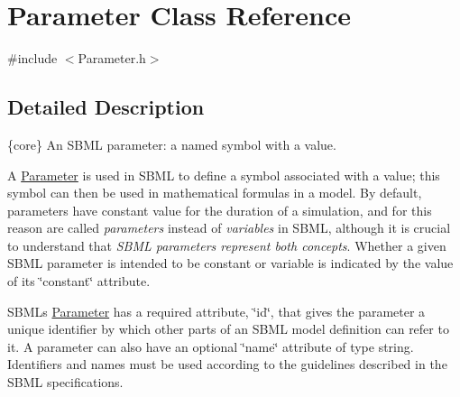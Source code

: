 \hypertarget{class_parameter}{}\section{Parameter Class Reference}
\label{class_parameter}


{\ttfamily \#include $<$Parameter.\+h$>$}



\subsection{Detailed Description}
\{core\} An S\+B\+ML parameter\+: a named symbol with a value.

A \hyperlink{class_parameter}{Parameter} is used in S\+B\+ML to define a symbol associated with a value; this symbol can then be used in mathematical formulas in a model. By default, parameters have constant value for the duration of a simulation, and for this reason are called {\itshape parameters} instead of {\itshape variables} in S\+B\+ML, although it is crucial to understand that {\itshape S\+B\+ML parameters represent both concepts}. Whether a given S\+B\+ML parameter is intended to be constant or variable is indicated by the value of its \char`\"{}constant\char`\"{} attribute.

S\+B\+ML\textquotesingle{}s \hyperlink{class_parameter}{Parameter} has a required attribute, \char`\"{}id\char`\"{}, that gives the parameter a unique identifier by which other parts of an S\+B\+ML model definition can refer to it. A parameter can also have an optional \char`\"{}name\char`\"{} attribute of type {\ttfamily string}. Identifiers and names must be used according to the guidelines described in the S\+B\+ML specifications.

